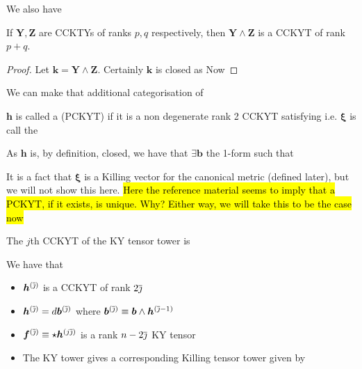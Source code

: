 \documentclass{article}
\begin{document}
We also have 
\begin{theorem}
If $\bm{Y},\bm{Z}$ are CCKTYs of ranks $p,q$ respectively, then $\bm{Y}\wedge\bm{Z}$ is a CCKYT of rank $p+q$.
\end{theorem}
\begin{proof}
Let $\bm{k} = \bm{Y} \wedge \bm{Z}$. Certainly $\bm{k}$ is closed as 
Now 
\end{proof}

We can make that additional categorisation of 
\begin{definition}
$\bm{h}$ is called a  (PCKYT) if it is a non degenerate rank 2 CCKYT satisfying 
i.e. 
$\bm{\xi}$ is call the 
\end{definition}
As $\bm{h}$ is, by definition, closed, we have that $\exists \bm{b}$ the  1-form such that 

It is a fact that $\bm{\xi}$ is a Killing vector for the canonical metric (defined later), but we will not show this here. 
\hl{Here the reference material seems to imply that a PCKYT, if it exists, is unique. Why? Either way, we will take this to be the case now}

\begin{definition}
The $j$th CCKYT of the KY tensor tower is 
\end{definition}

\begin{theorem}
We have that 
\begin{itemize}
    \item $\bm{h}^{(\overline{\jmath})}$ is a CCKYT of rank $2\overline{\jmath}$
    \item $\bm{h}^{(\overline{\jmath})} = d\bm{b}^{(\overline{\jmath})}$ where $\bm{b}^{(\overline{\jmath})} \equiv \bm{b} \wedge \bm{h}^{(\overline{\jmath}-1)}$
    \item $\bm{f}^{(\overline{\jmath})} \equiv \star\bm{h}^{(j\overline{\jmath})}$ is a rank $n-2\overline{\jmath}$ KY tensor
    \item The KY tower gives a corresponding Killing tensor tower given by  
\end{itemize}
\end{theorem}
\end{document}
